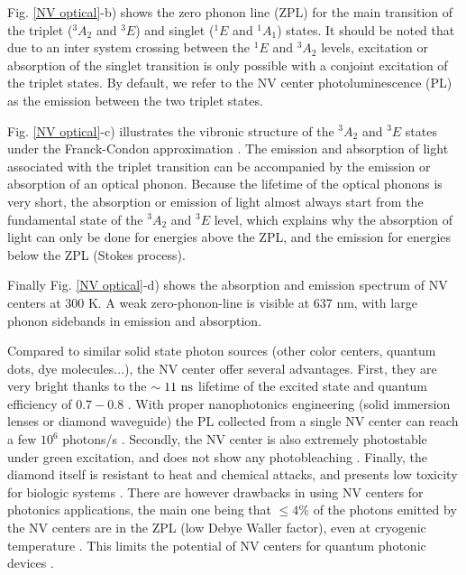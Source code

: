 \documentclass[a4paper,11pt]{report}
\begin{document}
\begin{refsection}
Fig. \ref{NV optical}-b) shows the zero phonon line (ZPL) for the main transition of the triplet ($^3A_2$ and $^3E$) and singlet ($^1E$ and $^1A_1$) states. It should be noted that due to an inter system crossing between the $^1E$ and $^3A_2$ levels, excitation or absorption of the singlet transition is only possible with a conjoint excitation of the triplet states. By default, we refer to the NV center photoluminescence (PL) as the emission between the two triplet states.

Fig. \ref{NV optical}-c) illustrates the vibronic structure of the $^3A_2$ and $^3E$ states under the Franck-Condon approximation \citep{gali2011time}. The emission and absorption of light associated with the triplet transition can be accompanied by the emission or absorption of an optical phonon. Because the lifetime of the optical phonons is very short, the absorption or emission of light almost always start from the fundamental state of the $^3A_2$ and $^3E$ level, which explains why the absorption of light can only be done for energies above the ZPL, and the emission for energies below the ZPL (Stokes process).

Finally Fig. \ref{NV optical}-d) shows the absorption and emission spectrum of NV centers at 300 K. A weak zero-phonon-line is visible at 637 nm, with large phonon sidebands in emission and absorption.

\medskip
Compared to similar solid state photon sources (other color centers, quantum dots, dye molecules...), the NV center offer several advantages. First, they are very bright thanks to the $\sim 11\ \rm ns$ lifetime of the excited state and quantum efficiency of $0.7-0.8$ \citep{schirhagl2014nitrogen}. With proper nanophotonics engineering (solid immersion lenses or diamond waveguide) the PL collected from a single NV center can reach a few $10^6$ photons/s \citep{schroder2016quantum}.  Secondly, the NV center is also extremely photostable under green excitation, and does not show any photobleaching \citep{brouri2000photon}. Finally, the diamond itself is resistant to heat and chemical attacks, and presents low toxicity for biologic systems \citep{fu2007characterization}. There are however drawbacks in using NV centers for photonics applications, the main one being that $\leq 4\%$ of the photons emitted by the NV centers are in the ZPL (low Debye Waller factor), even at cryogenic temperature \citep{johnson2015tunable}. This limits the potential of NV centers for quantum photonic devices \citep{bradac2019quantum}.


\end{refsection}
\end{document}
